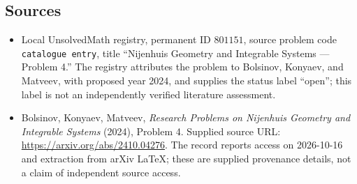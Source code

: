 \documentclass[11pt]{article}
\begin{document}
\subsection{Sources}
\begin{itemize}
\item Local UnsolvedMath registry, permanent ID \(801151\), source problem code \texttt{catalogue entry}, title ``Nijenhuis Geometry and Integrable Systems --- Problem 4.'' The registry attributes the problem to Bolsinov, Konyaev, and Matveev, with proposed year 2024, and supplies the status label ``open''; this label is not an independently verified literature assessment.
\item Bolsinov, Konyaev, Matveev, \emph{Research Problems on Nijenhuis Geometry and Integrable Systems} (2024), Problem 4. Supplied source URL: \url{https://arxiv.org/abs/2410.04276}. The record reports access on 2026-10-16 and extraction from arXiv LaTeX; these are supplied provenance details, not a claim of independent source access.
\end{itemize}
\end{document}
